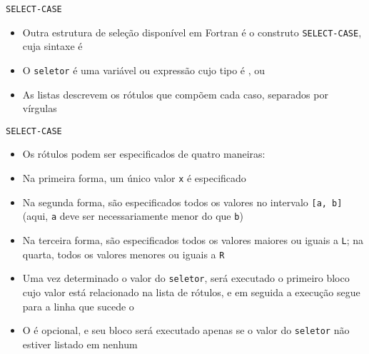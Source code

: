 \begin{frame}[fragile]{\tt SELECT-CASE}

    \begin{itemize}
        \item Outra estrutura de seleção disponível em Fortran é o construto \texttt{SELECT-CASE},
            cuja sintaxe é


        \item O \texttt{seletor} é uma variável ou expressão cujo tipo é ,
             ou 

        \item As listas descrevem os rótulos que compõem cada caso, separados por vírgulas

    \end{itemize}

\end{frame}

\begin{frame}[fragile]{\tt SELECT-CASE}
    \begin{itemize}
        \item Os rótulos podem ser especificados de quatro maneiras:


        \item Na primeira forma, um único valor \texttt{x} é especificado

        \item Na segunda forma, são especificados todos os valores no intervalo \texttt{[a, b]}
            (aqui, \texttt{a} deve ser necessariamente menor do que \texttt{b})

        \item Na terceira forma, são especificados todos os valores maiores ou iguais a 
            \texttt{L}; na quarta, todos os valores menores ou iguais a \texttt{R}

        \item Uma vez determinado o valor do \texttt{seletor}, será executado o primeiro bloco
            cujo valor está relacionado na lista de rótulos, e em seguida a execução segue para
            a linha que sucede o 

        \item O  é opcional, e seu bloco será executado apenas se
            o valor do \texttt{seletor} não estiver listado em nenhum 
    \end{itemize}

\end{frame}

